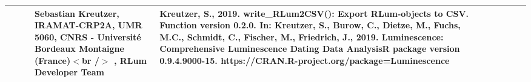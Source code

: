 \begin{table}[ht]
\begin{tabular}{rllllllll}
 &  &  & Sebastian Kreutzer, IRAMAT-CRP2A, UMR 5060, CNRS - Université Bordeaux Montaigne (France)$<$br /$>$ , RLum Developer Team & Kreutzer, S., 2019. write\_RLum2CSV(): Export RLum-objects to CSV. Function version 0.2.0. In: Kreutzer, S., Burow, C., Dietze, M., Fuchs, M.C., Schmidt, C., Fischer, M., Friedrich, J., 2019. Luminescence: Comprehensive Luminescence Dating Data AnalysisR package version 0.9.4.9000-15. https://CRAN.R-project.org/package=Luminescence
 \\ 
   \hline
\end{tabular}
\end{table}

